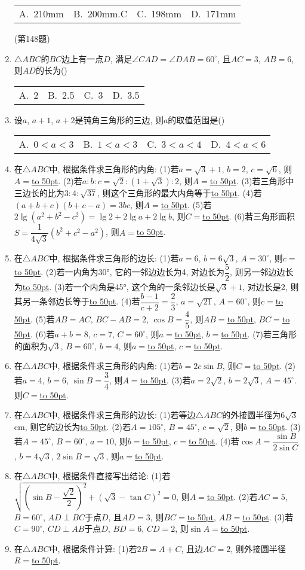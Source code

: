 \documentclass[10pt,a4paper]{article}
\newcommand{\blank}[1]{\underline{\hbox to #1pt{}}}
\newcommand{\fourch}[4]{\par\begin{tabular}{p{.23\textwidth}p{.23\textwidth}p{.23\textwidth}p{.23\textwidth}}
A.~#1 &B.~#2& C.~#3& D.~#4
\end{tabular}}
\begin{document}
\begin{enumerate}[1.]
\fourch{210mm}{200mm.C}{198mm}{171mm}
(第148题)
\item $\triangle ABC$的$BC$边上有一点$D$, 满足$\angle CAD=\angle DAB=60^{\circ }$, 且$AC=3$, $AB=6$, 则$AD$的长为()
\fourch{2}{2.5}{3}{3.5}
\item 设$a$, $a+1$, $a+2$是钝角三角形的三边, 则$a$的取值范围是()
\fourch{$0<a<3$}{$1<a<3$}{$3<a<4$}{$4<a<6$}
\item 在$\triangle ABC$中, 根据条件求三角形的内角:
(1)若$a=\sqrt 3+1$, $b=2$, $c=\sqrt 6$, 则$A=$\blank{50}.
(2)若$a:b:c=\sqrt 2:(1+\sqrt 3):2$, 则$A=$\blank{50}.
(3)若三角形中三边长的比为$3:4:\sqrt {37}$, 则这个三角形的最大内角等于\blank{50}.
(4)若$(a+b+c)(b+c-a)=3bc$, 则$A=$\blank{50}.
(5)若$2\lg (a^2+b^2-c^2)=\lg 2+2\lg a+2\lg b$, 则$C=$\blank{50}.
(6)若三角形面积$S=\dfrac 1{4\sqrt 3}(b^2+c^2-a^2)$, 则$A=$\blank{50}.
\item 在$\triangle ABC$中, 根据条件求三角形的边长:
(1)若$a=6$, $b=6\sqrt 3$, $A=30^\circ$, 则$c=$\blank{50}.
(2)若一内角为30°, 它的一邻边边长为4, 对边长为$\dfrac 52$, 则另一邻边边长为\blank{50}.
(3)若一个内角是45°, 这个角的一条邻边长是$\sqrt 3+1$, 对边长是2, 则其另一条邻边长等于\blank{50}.
(4)若$\dfrac{b-1}{c+2}=\dfrac 23$, $a=\sqrt {21}$, $A=60^{\circ }$, 则$c=$\blank{50}.
(5)若$AB=AC$, $BC-AB=2$, $\cos B=\dfrac 45$, 则$AB=$\blank{50}, $BC=$\blank{50}.
(6)若$a+b=8$, $c=7$, $C=60^{\circ }$, 则$a=$\blank{50}, $b=$\blank{50}.
(7)若三角形的面积为$\sqrt 3$, $B=60^\circ$, $b=4$, 则$a=$\blank{50}, $c=$\blank{50}.
\item 在$\triangle ABC$中, 根据条件求三角形的内角:
(1)若$b=2c\sin B$, 则$C=$\blank{50}.
(2)若$a=4$, $b=6$, $\sin B=\dfrac 34$, 则$A=$\blank{50}.
(3)若$a=2\sqrt 2$, $b=2\sqrt 3$, $A=45^\circ$. 则$C=$\blank{50}.
\item 在$\triangle ABC$中, 根据条件求三角形的边长:
(1)若等边$\triangle ABC$的外接圆半径为$6\sqrt 3$cm, 则它的边长为\blank{50}.
(2)若$A=105^\circ$, $B=45^\circ$, $c=\sqrt 2$, 则$b=$\blank{50}.
(3)若$A=45^\circ$, $B=60^{\circ }$, $a=10$, 则$b=$\blank{50}, $c=$\blank{50}.
(4)若$\cos A=\dfrac{\sin B}{2\sin C}$, $b=4\sqrt 3$, $2\sin B=\sqrt 3$, 则$a=$\blank{50}.
\item 在$\triangle ABC$中, 根据条件直接写出结论:
(1)若$\sqrt {(\sin B-\dfrac{\sqrt 2}2)^2}+(\sqrt 3-\tan C)^2=0$, 则$A=$\blank{50}.
(2)若$AC=5$, $B=60^{\circ }$, $AD\perp BC$于点$D$, 且$AD=3$, 则$BC=$\blank{50}, $AB=$\blank{50}.
(3)若$C=90^{\circ }$, $CD\perp AB$于点$D$, $BD=6$, $CD=2$, 则$\sin A=$\blank{50}.
\item 在$\triangle ABC$中, 根据条件计算:
(1)若$2B=A+C$, 且边$AC=2$, 则外接圆半径$R=$\blank{50}.

\end{enumerate}
\end{document}
